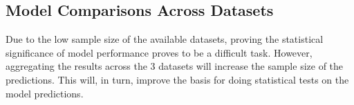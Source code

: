 
\subsection{Model Comparisons Across Datasets}
Due to the low sample size of the available datasets,
proving the statistical significance of model performance proves to be a difficult task.
However, aggregating the results across the 3 datasets will increase the sample size of the predictions.
This will, in turn, improve the basis for doing statistical tests on the model predictions. 


